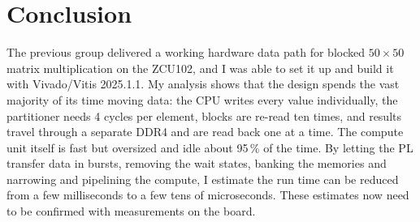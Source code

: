 \documentclass[11pt,a4paper]{article}
\begin{document}
\section{Conclusion}
The previous group delivered a working hardware data path for blocked $50\times50$ matrix multiplication on the ZCU102, and I was able to set it up and build it with Vivado/Vitis 2025.1.1. My analysis shows that the design spends the vast majority of its time moving data: the CPU writes every value individually, the partitioner needs 4 cycles per element, blocks are re-read ten times, and results travel through a separate DDR4 and are read back one at a time. The compute unit itself is fast but oversized and idle about 95\,\% of the time. By letting the PL transfer data in bursts, removing the wait states, banking the memories and narrowing and pipelining the compute, I estimate the run time can be reduced from a few milliseconds to a few tens of microseconds. These estimates now need to be confirmed with measurements on the board.
\end{document}
